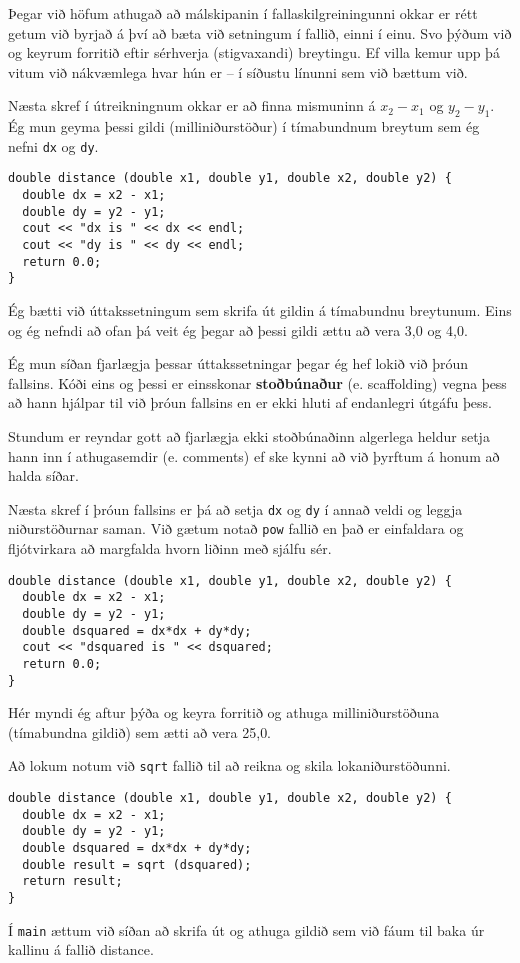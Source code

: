 Þegar við höfum athugað að málskipanin í fallaskilgreiningunni okkar er rétt getum við byrjað á því að bæta við setningum í fallið, einni í einu.
Svo þýðum við og keyrum forritið eftir sérhverja (stigvaxandi) breytingu.
Ef villa kemur upp þá vitum við nákvæmlega hvar hún er -- í síðustu línunni sem við bættum við.

Næsta skref í útreikningnum okkar er að finna mismuninn á $x_2 - x_1$ og $y_2 - y_1$.
Ég mun geyma þessi gildi (milliniðurstöður) í tímabundnum breytum sem ég nefni {\tt dx} og {\tt dy}.

\begin{verbatim}
double distance (double x1, double y1, double x2, double y2) {
  double dx = x2 - x1;
  double dy = y2 - y1;
  cout << "dx is " << dx << endl;
  cout << "dy is " << dy << endl;
  return 0.0;
}
\end{verbatim}
%
Ég bætti við úttakssetningum sem skrifa út gildin á tímabundnu breytunum. 
Eins og ég nefndi að ofan þá veit ég þegar að þessi gildi ættu að vera 3,0 og 4,0.


Ég mun síðan fjarlægja þessar úttakssetningar þegar ég hef lokið við þróun fallsins.
Kóði eins og þessi er einsskonar {\bf stoðbúnaður} (e. scaffolding) vegna þess að hann hjálpar til við þróun fallsins en er ekki hluti af endanlegri útgáfu þess.

Stundum er reyndar gott að fjarlægja ekki stoðbúnaðinn algerlega heldur setja hann inn í athugasemdir (e. comments) ef ske kynni að við þyrftum á honum að halda síðar.

Næsta skref í þróun fallsins er þá að setja {\tt dx} og {\tt dy} í annað veldi og leggja niðurstöðurnar saman.
Við gætum notað {\tt pow} fallið en það er einfaldara og fljótvirkara að margfalda hvorn liðinn með sjálfu sér.

\begin{verbatim}
double distance (double x1, double y1, double x2, double y2) {
  double dx = x2 - x1;
  double dy = y2 - y1;
  double dsquared = dx*dx + dy*dy;
  cout << "dsquared is " << dsquared;
  return 0.0;
}
\end{verbatim}
%
Hér myndi ég aftur þýða og keyra forritið og athuga milliniðurstöðuna (tímabundna gildið) sem ætti að vera 25,0.

Að lokum notum við {\tt sqrt} fallið til að reikna og skila lokaniðurstöðunni.

\begin{verbatim}
double distance (double x1, double y1, double x2, double y2) {
  double dx = x2 - x1;
  double dy = y2 - y1;
  double dsquared = dx*dx + dy*dy;
  double result = sqrt (dsquared);
  return result;
}
\end{verbatim}
%
Í {\tt main} ættum við síðan að skrifa út og athuga gildið sem við fáum til baka úr kallinu á fallið distance.

